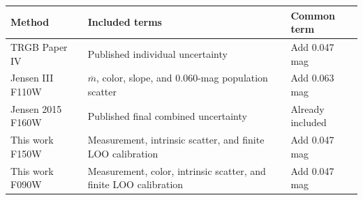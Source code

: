\begin{tabular}{lp{7.4cm}p{3.2cm}}
\toprule
Method & Included terms & Common term \\
\midrule
TRGB Paper IV & Published individual uncertainty & Add 0.047 mag \\
Jensen III F110W & $\overline m$, color, slope, and 0.060-mag population scatter & Add 0.063 mag \\
Jensen 2015 F160W & Published final combined uncertainty & Already included \\
This work F150W & Measurement, intrinsic scatter, and finite LOO calibration & Add 0.047 mag \\
This work F090W & Measurement, color, intrinsic scatter, and finite LOO calibration & Add 0.047 mag \\
\bottomrule
\end{tabular}
